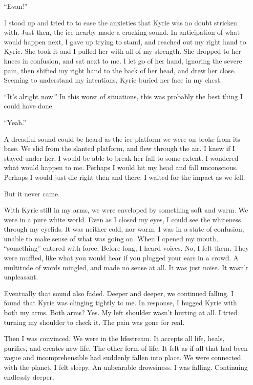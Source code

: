 \documentclass[oneside]{book}
\begin{document}
“Evan!”

I stood up and tried to to ease the anxieties that Kyrie was no doubt stricken with. Just then, the ice nearby made a cracking sound. In anticipation of what would happen next, I gave up trying to stand, and reached out my right hand to Kyrie. She took it and I pulled her with all of my strength. She dropped to her knees in confusion, and sat next to me. I let go of her hand, ignoring the severe pain, then shifted my right hand to the back of her head, and drew her close. Seeming to understand my intentions, Kyrie buried her face in my chest.

“It’s alright now.” In this worst of situations, this was probably the best thing I could have done.

“Yeah.”

A dreadful sound could be heard as the ice platform we were on broke from its base. We slid from the slanted platform, and flew through the air. I knew if I stayed under her, I would be able to break her fall to some extent. I wondered what would happen to me. Perhaps I would hit my head and fall unconscious. Perhaps I would just die right then and there. I waited for the impact as we fell.

But it never came.

With Kyrie still in my arms, we were enveloped by something soft and warm. We were in a pure white world. Even as I closed my eyes, I could see the whiteness through my eyelids. It was neither cold, nor warm. I was in a state of confusion, unable to make sense of what was going on. When I opened my mouth, “something” entered with force. Before long, I heard voices. No, I felt them. They were muffled, like what you would hear if you plugged your ears in a crowd. A multitude of words mingled, and made no sense at all. It was just noise. It wasn’t unpleasant.

Eventually that sound also faded. Deeper and deeper, we continued falling. I found that Kyrie was clinging tightly to me. In response, I hugged Kyrie with both my arms. Both arms? Yes. My left shoulder wasn’t hurting at all. I tried turning my shoulder to check it. The pain was gone for real.

Then I was convinced. We were in the lifestream. It accepts all life, heals, purifies, and creates new life. The other form of life. It felt as if all that had been vague and incomprehensible had suddenly fallen into place. We were connected with the planet. I felt sleepy. An unbearable drowsiness. I was falling. Continuing endlessly deeper.
\end{document}

